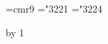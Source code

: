

\def\hang{\hangindent 3em\indent\ignorespaces}
\font\ninerm=cmr9
\let\mc=\ninerm %
\def\PASCAL{Pascal}
\def\pb{$\.|\ldots\.|$} %
\def\v{\.{\char'174}} %
\def\dleft{[\![} \def\dright{]\!]} %
\mathchardef\RA="3221 %
\mathchardef\BA="3224 %
\def\({} %

\def\title{WEAVE}
\def\contentspagenumber{15} %
\def\topofcontents{\null\vfill
  \titlefalse %
  \def\rheader{\mainfont Appendix D\hfil \contentspagenumber}
  \centerline{\titlefont The {\ttitlefont WEAVE} processor}
  \vskip 15pt
  \centerline{(Version 4.5)}
  \vfill}
\pageno=\contentspagenumber \advance\pageno by 1


